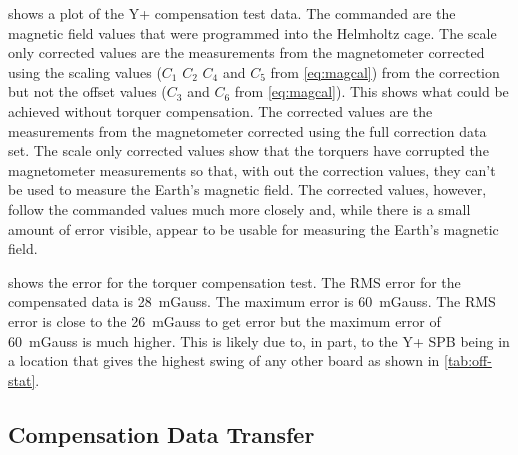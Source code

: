  shows a plot of the Y+ compensation test data. The commanded are the magnetic field values that were programmed into the Helmholtz cage. The scale only corrected values are the measurements from the magnetometer corrected using the scaling values ($C_1$ $C_2$ $C_4$ and $C_5$ from \cref{eq:magcal}) from the correction but not the offset values ($C_3$ and $C_6$ from \cref{eq:magcal}). This shows what could be achieved without torquer compensation. The corrected values are the measurements from the magnetometer corrected using the full correction data set. The scale only corrected values show that the torquers have corrupted the magnetometer measurements so that, with out the correction values, they can't be used to measure the Earth's magnetic field. The corrected values, however, follow the commanded values much more closely and, while there is a small amount of error visible, appear to be usable for measuring the Earth's magnetic field.


 shows the error for the torquer compensation test. The RMS error for the compensated data is 28~mGauss. The maximum error is 60~mGauss. The RMS error is close to the 26~mGauss to get {\textdegree} error but the maximum error of 60~mGauss is much higher. This is likely due to, in part, to the Y+ \ac{SPB} being in a location that gives the highest swing of any other board as shown in \cref{tab:off-stat}.


\subsection{Compensation Data Transfer}

